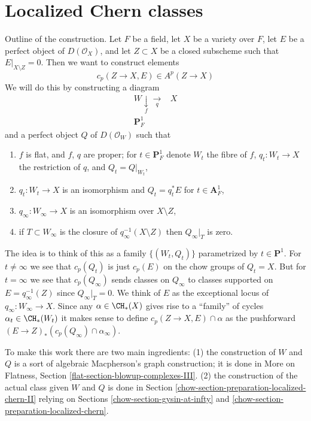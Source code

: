 \section{Localized Chern classes}
\label{chow-section-localized-chern}
Outline of the construction. Let $F$ be a field,
let $X$ be a variety over $F$, let $E$ be a perfect object of
$D(\mathcal{O}_X)$, and let $Z \subset X$ be a closed subscheme
such that $E|_{X \setminus Z} = 0$. Then we want to construct elements
$$
c_p(Z \to X, E) \in A^p(Z \to X)
$$
We will do this by constructing a diagram
$$
\begin{array}{cc}W \underset{f}{\downarrow}\underset{q}{\longrightarrow} & X \\ \mathbf{P}^1_F & \end{array}
$$
and a perfect object $Q$ of $D(\mathcal{O}_W)$ such that
\begin{enumerate}
\item $f$ is flat, and $f$, $q$ are proper; for $t \in \mathbf{P}^1_F$
denote $W_t$ the fibre of $f$,
$q_t : W_t \to X$ the restriction of $q$, and $Q_t = Q|_{W_t}$,
\item $q_t : W_t \to X$ is an isomorphism and $Q_t = q_t^*E$
for $t \in \mathbf{A}^1_F$,
\item $q_\infty : W_\infty \to X$ is an isomorphism over $X \setminus Z$,
\item if $T \subset W_\infty$ is the closure of
$q_\infty^{-1}(X \setminus Z)$ then $Q_\infty|_T$ is zero.
\end{enumerate}
The idea is to think of this as a family $\{(W_t, Q_t)\}$
parametrized by $t \in \mathbf{P}^1$.
For $t \not = \infty$ we see that $c_p(Q_t)$ is just $c_p(E)$
on the chow groups of $Q_t = X$. But for $t = \infty$ we see that
$c_p(Q_\infty)$ sends classes on $Q_\infty$ to classes supported on
$E = q_\infty^{-1}(Z)$ since $Q_\infty|_T = 0$.
We think of $E$ as the exceptional locus of $q_\infty : W_\infty \to X$.
Since any $\alpha \in \CH_*(X)$ gives rise to a ``family''
of cycles $\alpha_t \in \CH_*(W_t)$ it makes sense to define
$c_p(Z \to X, E) \cap \alpha$ as
the pushforward $(E \to Z)_*(c_p(Q_\infty) \cap \alpha_\infty)$.

\medskip\noindent
To make this work there are two main ingredients: (1) the construction of
$W$ and $Q$ is a sort of algebraic Macpherson's graph construction; it
is done in More on Flatness, Section \ref{flat-section-blowup-complexes-III}.
(2) the construction of the actual class given $W$ and $Q$ is done in
Section \ref{chow-section-preparation-localized-chern-II} relying on
Sections \ref{chow-section-gysin-at-infty} and
\ref{chow-section-preparation-localized-chern}.

